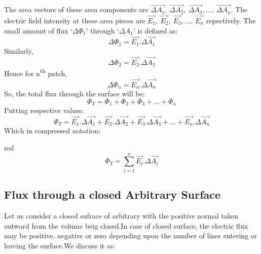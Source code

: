 The area vectors of these area components are $\vec{\Delta A_{1}},\:\vec{\Delta A_{2}},\:\vec{\Delta A_{3}},...,\:\vec{\Delta A_{n}}$.
The electric field intensity at these area pieces are $\vec{E_{1}},\:\vec{E_{2}},\:\vec{E_{3}},...,\:\vec{E_{n}}$ repectively.
The small amount of flux `$\Delta \Phi_{1}$' through `$\Delta A_{1}$' is defined as:
\begin{equation}
  \Delta \Phi_{1} = \vec{E_{1}}.\Delta \vec{A_{1}} \nonumber
\end{equation}
Similarly,
\begin{equation}
  \Delta \Phi_{2} = \vec{E_{2}}.\Delta \vec{A_{2}} \nonumber
\end{equation}
Hence for n\textsuperscript{th} patch, 
\begin{equation}
  \Delta \Phi_{n} = \vec{E_{n}}.\Delta \vec{A_{n}} \nonumber
\end{equation}
So, the total flux through the surface will be:
\begin{equation}
  \Phi_{T} =  \Phi_{1}+ \Phi_{2}+ \Phi_{3}+...+ \Phi_{n} \nonumber
\end{equation}
Putting respective values:
\begin{equation}
  \Phi_{T} = \vec{E_{1}}.\Delta \vec{A_{1}}+\vec{E_{2}}.\Delta \vec{A_{2}} +\vec{E_{3}}.\Delta \vec{A_{3}}+...+\vec{E_{n}}.\Delta \vec{A_{n}} \nonumber
\end{equation}
Which in compressed notation:
\begin{mybox}{red}{}
\begin{equation} \label{eq:11.19}
  \Phi_{T} = \sum_{i=1}^{n} \vec{E_{i}}.\Delta \vec{A_{i}} 
\end{equation}
\end{mybox}
\subsection{Flux through a closed Arbitrary Surface}
Let us consider a closed sufrace of arbitrary with the positive normal
taken outward from the volume beig closed.In case of closed surface,
the electric flux may be positive, negative or zero depending upon
the number of lines entering or leaving the surface.We discuss it as:


